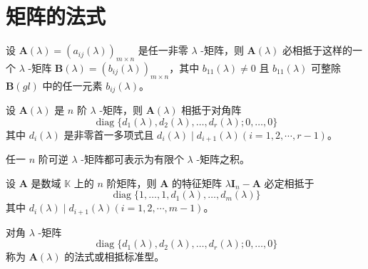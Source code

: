 \section{矩阵的法式}

\begin{lemma}
    设 $\bm{A}(\lambda) = (a_{ij}(\lambda))_{m \times n}$ 是任一非零 $\lambda$ -矩阵，则 $\bm{A}(\lambda)$ 必相抵于这样的一个 $\lambda$ -矩阵 $\bm{B}(\lambda) = (b_{ij}(\lambda))_{m \times n}$，其中 $b_{11}(\lambda) \neq 0$ 且 $b_{11}(\lambda)$ 可整除 $\bm{B}(gl)$ 中的任一元素 $b_{ij}(\lambda)$。
\end{lemma}

\begin{theorem}
    设 $\bm{A}(\lambda)$ 是 $n$ 阶 $\lambda$ -矩阵，则 $\bm{A}(\lambda)$ 相抵于对角阵
    \[
        \operatorname{diag}\{ d_{1}(\lambda), d_{2}(\lambda), \ldots, d_{r}(\lambda); 0, \ldots, 0 \}
    \]
    其中 $d_{i}(\lambda)$ 是非零首一多项式且 $d_{i}(\lambda) \mid d_{i + 1}(\lambda)(i = 1, 2, \cdots, r - 1)$。
\end{theorem}

\begin{corollary}
    任一 $n$ 阶可逆 $\lambda$ -矩阵都可表示为有限个 $\lambda$ -矩阵之积。
\end{corollary}

\begin{corollary}
    设 $\bm{A}$ 是数域 $\mathbb{K}$ 上的 $n$ 阶矩阵，则 $\bm{A}$ 的特征矩阵 $\lambda \bm{I}_{n} - \bm{A}$ 必定相抵于
    \[
        \operatorname{diag}\{ 1, \ldots, 1, d_{1}(\lambda), \ldots, d_{m}(\lambda) \}
    \]
    其中 $d_{i}(\lambda) \mid d_{i + 1}(\lambda)(i = 1, 2, \cdots, m - 1)$。
\end{corollary}


\begin{definition}
  对角 $\lambda$ -矩阵
  \[
        \operatorname{diag}\{ d_{1}(\lambda), d_{2}(\lambda), \ldots, d_{r}(\lambda); 0, \ldots, 0 \}
  \]
  称为 $\bm{A}(\lambda)$ 的法式或相抵标准型。
\end{definition}



\section{}







